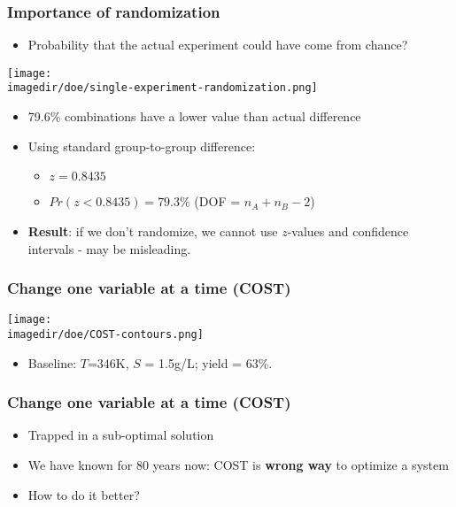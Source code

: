 \begin{frame}\frametitle{Importance of randomization}
	\begin{itemize}
		\item	Probability that the actual experiment could have come from chance?
	\end{itemize}
	\begin{center}
		\texttt{[image: \\imagedir/doe/single-experiment-randomization.png]}
	\end{center}
	\begin{itemize}
		\item	79.6\% combinations have a lower value than actual difference
		\item	Using standard group-to-group difference:
		\begin{itemize}
			\item	$z = 0.8435$
			\item	$Pr(z<0.8435) = 79.3\%$ (DOF = $n_A + n_B - 2$)
		\end{itemize}
	\end{itemize}
	\begin{itemize}
		\item	\textbf{Result}: if we don't randomize, we cannot use $z$-values and confidence intervals - may be misleading.
	\end{itemize}
\end{frame}

\begin{frame}\frametitle{Change one variable at a time (COST)}
	\begin{center}
		\texttt{[image: \\imagedir/doe/COST-contours.png]}
	\end{center}
	\begin{itemize}
		\item	Baseline: $T$=346K, $S$ = 1.5g/L; yield = 63\%.
	\end{itemize}
\end{frame}

\begin{frame}\frametitle{Change one variable at a time (COST)}
	\begin{itemize}
		\item	Trapped in a sub-optimal solution
		\item	We have known for 80 years now: COST is \textbf{wrong way} to optimize a system
		\item	How to do it better?
	\end{itemize}
\end{frame}

